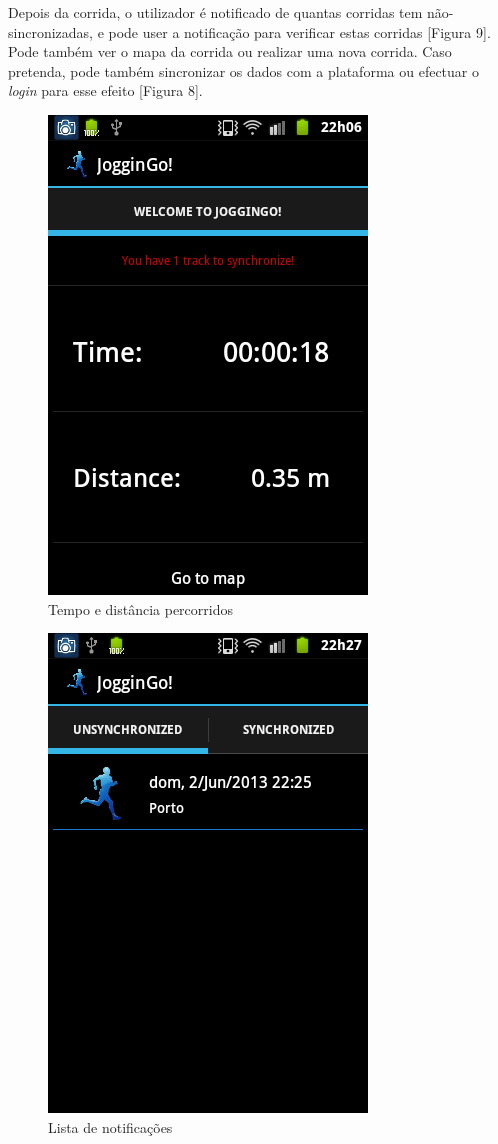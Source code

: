 \documentclass[15pt,a4paper]{article}
\begin{document}
Depois da corrida, o utilizador é notificado de quantas corridas tem não-sincronizadas, e pode user a notificação para verificar estas corridas [Figura 9]. Pode também ver o mapa da corrida ou realizar uma nova corrida. Caso pretenda, pode também sincronizar os dados com a plataforma ou efectuar o \textit{login} para esse efeito [Figura 8].

\begin{figure}[htp]
  \centering
  \includegraphics[scale=0.5]{android_5.png}
  \caption{Tempo e distância percorridos}
\end{figure}

\begin{figure}[htp]
  \centering
  \includegraphics[scale=0.5]{android_6.png}
  \caption{Lista de notificações}
\end{figure}
\end{document}
